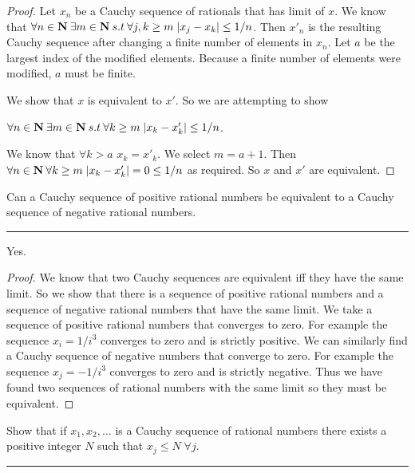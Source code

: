 \documentclass[11pt]{article}
\begin{document}
\begin{proof}

Let $x_n$ be a Cauchy sequence of rationals that has limit of $x$. We know that $\forall n \in \mathbf{N} \: \exists m \in \mathbf{N} \: s.t \: \forall j,k \geq m \; |x_j - x_k| \leq 1/n$. Then $x'_n$ is the resulting Cauchy sequence after changing a finite number of elements in $x_n$. Let $a$ be the largest index of the modified elements. Because a finite number of elements were modified, $a$ must be finite.

We show that $x $ is equivalent to $x'$. So we are attempting to show 

$\forall n \in \mathbf{N} \: \exists m \in \mathbf{N} \: s.t \: \forall k \geq m \; |x_k - x'_k| \leq 1/n$. 

We know that $\forall  k > a$ $x_k = x'_k$. We select $m = a + 1$. Then 
$\forall n \in \mathbf{N} \: \forall k \geq m \; |x_k - x'_k| = 0 \leq 1/n$ as required. So $x$ and $x'$ are equivalent.

\end{proof}



\newpage
{}
Can a Cauchy sequence of positive rational numbers be equivalent to a Cauchy sequence of negative rational numbers. 
\hrule

Yes. 

\begin{proof}

We know that two Cauchy sequences are equivalent iff they have the same limit. So we show that there is a sequence of positive rational numbers and a sequence of negative rational numbers that have the same limit. We take a sequence of positive rational numbers that converges to zero. For example the sequence $x_i = 1/i^3$ converges to zero and is strictly positive. We can similarly find a Cauchy sequence of negative numbers that converge to zero. For example the sequence $x_j = -1/i^3$ converges to zero and is strictly negative. Thus we have found two sequences of rational numbers with the same limit so they must be equivalent. 

\end{proof}


\newpage
{}
Show that if $x_1, x_2, ...$ is a Cauchy sequence of rational numbers there exists a positive integer $N$ such that $x_j \leq N \; \forall j$.
\hrule
\end{document}
